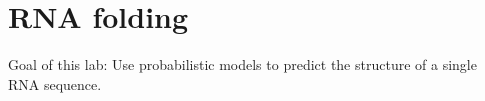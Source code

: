 \chapter{RNA folding}

Goal of this lab:
Use probabilistic models to predict the structure of a single RNA sequence.

